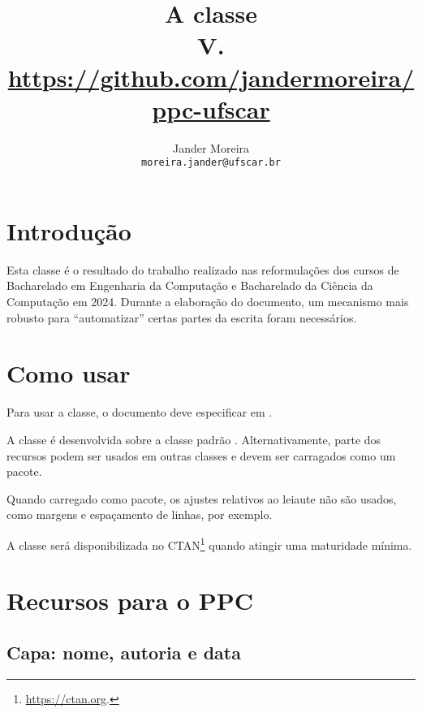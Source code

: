 \documentclass[a4paper, 11pt]{article}
\title{
    A classe \PackageName{ppc-ufscar}\\
    \small V.\PPCVersion\\
    \url{https://github.com/jandermoreira/ppc-ufscar}
}
\author{Jander Moreira\\\footnotesize\texttt{moreira.jander@ufscar.br}}
\date{}
\begin{document}
\maketitle

\PDPrintChanges


\section{Introdução}
Esta classe é o resultado do trabalho realizado nas reformulações dos cursos de Bacharelado em Engenharia da Computação e Bacharelado da Ciência da Computação em 2024. Durante a elaboração do documento, um mecanismo mais robusto para ``automatizar'' certas partes da escrita foram necessários.


\section{Como usar}
Para usar a classe, o documento deve especificar  em .


A classe é desenvolvida sobre a classe padrão . Alternativamente, parte dos recursos podem ser usados em outras classes e devem ser carragados como um pacote.


Quando carregado como pacote, os ajustes relativos ao leiaute não são usados, como margens e espaçamento de linhas, por exemplo.

A classe será disponibilizada no CTAN\footnote{\url{https://ctan.org}.} quando atingir uma maturidade mínima.


\section{Recursos para o PPC}

\subsection{Capa: nome, autoria e data}
\end{document}
